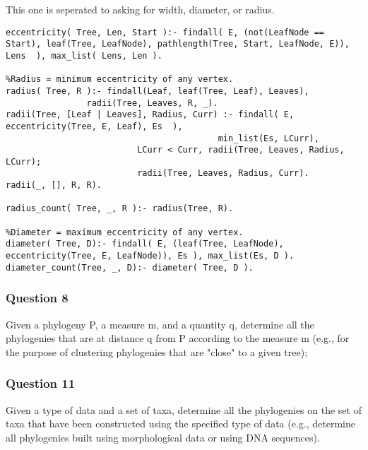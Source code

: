 \documentclass[10pt]{article}
\begin{document}
This one is seperated to asking for width, diameter, or radius.
\begin{verbatim}
eccentricity( Tree, Len, Start ):- findall( E, (not(LeafNode == Start), leaf(Tree, LeafNode), pathlength(Tree, Start, LeafNode, E)), Lens  ), max_list( Lens, Len ).

%Radius = minimum eccentricity of any vertex.
radius( Tree, R ):- findall(Leaf, leaf(Tree, Leaf), Leaves),
	       	    radii(Tree, Leaves, R, _).
radii(Tree, [Leaf | Leaves], Radius, Curr) :- findall( E, eccentricity(Tree, E, Leaf), Es  ),
	                                      min_list(Es, LCurr),
					      LCurr < Curr, radii(Tree, Leaves, Radius, LCurr);
					      radii(Tree, Leaves, Radius, Curr).
radii(_, [], R, R).

radius_count( Tree, _, R ):- radius(Tree, R).

%Diameter = maximum eccentricity of any vertex.
diameter( Tree, D):- findall( E, (leaf(Tree, LeafNode), eccentricity(Tree, E, LeafNode)), Es ), max_list(Es, D ).
diameter_count(Tree, _, D):- diameter( Tree, D ).
\end{verbatim}





\subsubsection{Question 8}
Given a phylogeny P, a measure m, and a quantity q, determine all the phylogenies that are at distance q from P according to the measure m (e.g., for the purpose of clustering phylogenies that are "close" to a given tree);
\subsubsection{Question 11}
Given a type of data and a set of taxa, determine all the phylogenies on the set of taxa that have been constructed using the specified type of data (e.g., determine all phylogenies built using morphological data or using DNA sequences).	
\end{document}
